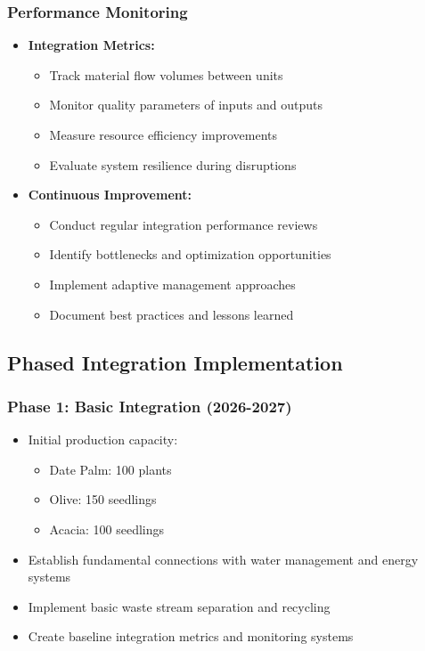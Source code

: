 \subsubsection{Performance Monitoring}
\begin{itemize}
    \item \textbf{Integration Metrics:}
    \begin{itemize}
        \item Track material flow volumes between units
        \item Monitor quality parameters of inputs and outputs
        \item Measure resource efficiency improvements
        \item Evaluate system resilience during disruptions
    \end{itemize}
    
    \item \textbf{Continuous Improvement:}
    \begin{itemize}
        \item Conduct regular integration performance reviews
        \item Identify bottlenecks and optimization opportunities
        \item Implement adaptive management approaches
        \item Document best practices and lessons learned
    \end{itemize}
\end{itemize}

\subsection{Phased Integration Implementation}

\subsubsection{Phase 1: Basic Integration (2026-2027)}
\begin{itemize}
    \item Initial production capacity:
    \begin{itemize}
        \item Date Palm: 100 plants
        \item Olive: 150 seedlings
        \item Acacia: 100 seedlings
    \end{itemize}
    \item Establish fundamental connections with water management and energy systems
    \item Implement basic waste stream separation and recycling
    \item Create baseline integration metrics and monitoring systems
\end{itemize}

